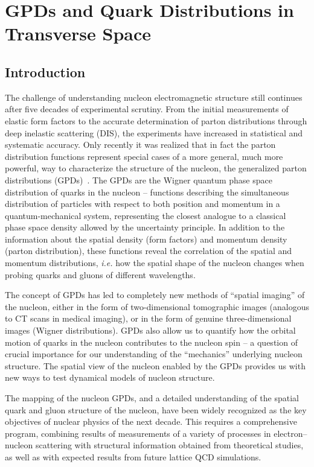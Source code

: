 \chapter{GPDs and Quark Distributions in Transverse Space}

\section{Introduction}

The challenge of understanding nucleon electromagnetic structure still 
continues after five decades of experimental scrutiny. From the initial 
measurements of elastic form factors to the accurate determination of 
parton distributions through deep inelastic scattering (DIS), the
experiments have increased in statistical and systematic accuracy.  Only 
recently it was realized that in fact the parton distribution functions
represent special cases of a more general, much more powerful, way to 
characterize the structure of the nucleon, the generalized parton 
distributions (GPDs)~\cite{Ji:1996nm,Ji:1996ek,Radyushkin:1996nd,
Radyushkin:1997ki}.  The GPDs are the Wigner quantum phase space 
distribution of quarks in the nucleon -- functions describing the 
simultaneous distribution of particles with respect to both position and 
momentum in a quantum-mechanical system, representing the closest analogue 
to a classical phase space density allowed by the uncertainty principle. 
In addition to the information about the spatial density (form factors) 
and momentum density (parton distribution), these functions reveal the 
correlation of the spatial and momentum distributions, {\it i.e.} how the 
spatial shape of the nucleon changes when probing quarks and gluons of 
different wavelengths.

The concept of GPDs has led to completely new methods of ``spatial imaging''
of the nucleon, either in the form of two-dimensional tomographic images 
(analogous to CT scans in medical imaging), or in the form of genuine 
three-dimensional images (Wigner distributions).  GPDs also allow us to 
quantify how the orbital motion of quarks in the nucleon contributes to the 
nucleon spin -- a question of crucial importance for our understanding of 
the ``mechanics'' underlying nucleon structure.  The spatial view of the 
nucleon enabled by the GPDs provides us with new ways to test dynamical 
models of nucleon structure. 

The mapping of the nucleon GPDs, and a detailed understanding of the
spatial quark and gluon structure of the nucleon, have been widely 
recognized as the key objectives of nuclear physics of the 
next decade. This requires a comprehensive program, combining results
of measurements of a variety of processes in electron--nucleon 
scattering with structural information obtained from theoretical studies, 
as well as with expected results from future lattice QCD simulations.

